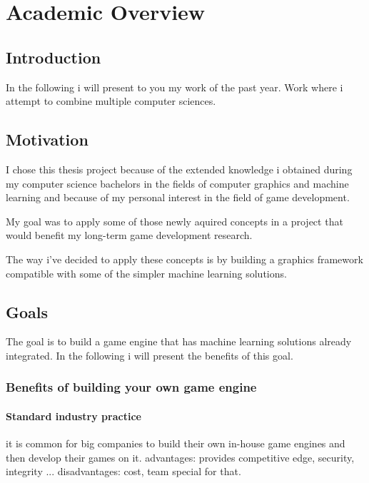 

\part*{Academic Overview}

  \chapter*{Introduction} 

    In the following i will present to you my work of the past year. Work where i attempt to combine multiple computer sciences. 

  \chapter{Motivation}

      I chose this thesis project because of the extended knowledge i obtained during my computer science bachelors in the fields of computer graphics and machine learning and because of my personal interest in the field of game development.

      My goal was to apply some of those newly aquired concepts in a project that would benefit my long-term game development research. 

      The way i've decided to apply these concepts is by building a graphics framework compatible with some of the simpler machine learning solutions.

  \chapter{Goals}

      The goal is to build a game engine that has machine learning solutions already integrated. 
      In the following i will present the benefits of this goal.

      \section{Benefits of building your own game engine}
          \subsection{Standard industry practice}
              it is common for big companies to build their own in-house game engines and then develop their games on it.
              advantages:     provides competitive edge, security, integrity ...
              disadvantages:  cost, team special for that.

